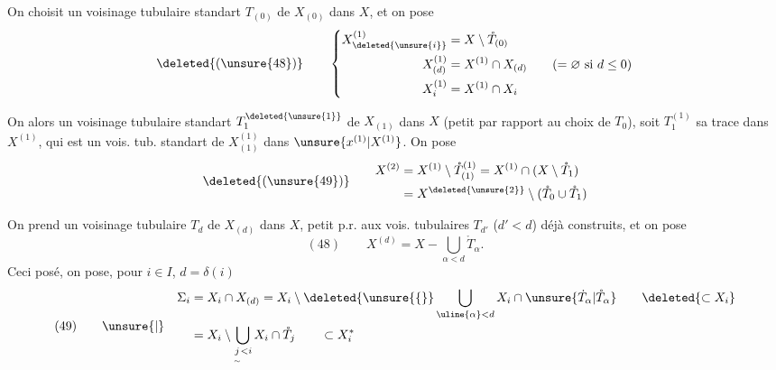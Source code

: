 On choisit un voisinage tubulaire standart $T_{(0)}$ de
$X_{(0)}$ dans $X$, et on pose
\[
\deleted{(\unsure{48})}\qquad
\left\{\begin{aligned}
X^{(1)}_{\deleted{\unsure{i}}}&=X\setminus\mathring T_{(0)}\\
X^{(1)}_{(d)}&=X^{(1)}\cap X_{(d)}\qquad(=\varnothing\text{ si }d\leq0)\\
X^{(1)}_i&=X^{(1)}\cap X_i
\end{aligned}\right.
\]

On  alors un voisinage tubulaire
standart  $T_1^{\deleted{\unsure{1}}}$ de $X_{(1)}$ dans $X$
(petit par rapport au choix de $T_0$), soit $T_1^{(1)}$ sa trace dans
$X^{(1)}$, qui est un vois. tub. standart de $X^{(1)}_{(1)}$ dans
$\unsure{x^{(1)}|X^{(1)}}$. On pose
\[
\deleted{(\unsure{49})}\qquad
\begin{aligned}
X^{(2)}&=X^{(1)}\setminus\mathring T^{(1)}_{(1)}
=X^{(1)}\cap(X\setminus\mathring T_1)\\
&=X^{\deleted{\unsure{2}}}\setminus(\mathring T_0\cup\mathring T_1)
\end{aligned}
\]

On prend un voisinage tubulaire $T_d$ de $X_{(d)}$ dans $X$,
petit p.r. aux vois. tubulaires $T_{d'}$ ($d'<d$) déjà construits,
et on pose
\[
(48)\qquad X^{(d)}=X-\bigcup_{\alpha<d}\mathring T_\alpha.
\]
Ceci posé, on pose, pour $i\in I$, $d=\delta(i)$
\[
(49)\qquad\unsure{|}\quad
\begin{aligned}
\Sigma_i&=X_i\cap X_{(d)}
=X_i\setminus\deleted{\unsure{\{}}\bigcup_{\uline{\alpha}<d}X_i\cap
\unsure{\dot T_\alpha|\mathring T_\alpha}
\qquad\deleted{\subset X_i}\\
&=X_i\setminus\bigcup_{\underset{\sim}{j}<i}X_i\cap\mathring T_j
\qquad\subset X_i^*
\end{aligned}
\]
